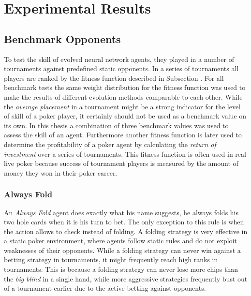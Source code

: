 

\chapter{Experimental Results}
\label{cha:results}


\section{Benchmark Opponents}
To test the skill of evolved neural network agents, they played in a number of tournaments against predefined static opponents. In a series of tournaments all players are ranked by the fitness function described in Subsection . For all benchmark tests the same weight distribution for the fitness function was used to make the results of different evolution methods comparable to each other. While the \textit{average placement} in a tournament might be a strong indicator for the level of skill of a poker player, it certainly should not be used as a benchmark value on its own. In this thesis a combination of three benchmark values was used to assess the skill of an agent. Furthermore another fitness function is later used to determine the profitability of a poker agent by calculating the \textit{return of investment} over a series of tournaments. This fitness function is often used in real live poker because success of tournament players is measured by the amount of money they won in their poker career.

\subsection{Always Fold}
An \textit{Always Fold} agent does exactly what his name suggests, he always folds his two hole cards when it is his turn to bet. The only exception to this rule is when the action allows to check instead of folding. A folding strategy is very effective in a static poker environment, where agents follow static rules and do not exploit weaknesses of their opponents. While a folding strategy can never win against a betting strategy in tournaments, it might frequently reach high ranks in tournaments. This is because a folding strategy can never lose more chips than the \textit{big blind} in a single hand, while more aggressive strategies frequently bust out of a tournament earlier due to the active betting against opponents.
